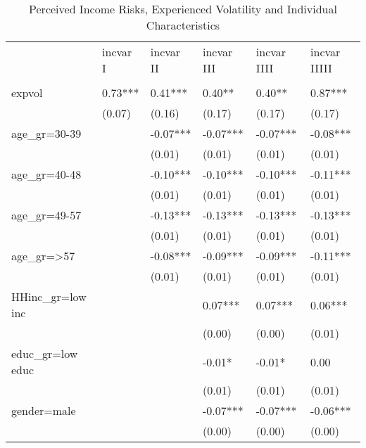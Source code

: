 
\begin{table}[p]
\centering
\begin{adjustbox}{width=\textwidth}
\begin{threeparttable}
\caption{Perceived Income Risks, Experienced Volatility and Individual Characteristics}
\label{micro_reg}\begin{tabular}{llllll}
\toprule
{} & incvar I & incvar II & incvar III & incvar IIII & incvar IIIII \\
                 &          &           &            &             &              \\
\midrule
expvol           &  0.73*** &   0.41*** &     0.40** &      0.40** &      0.87*** \\
                 &   (0.07) &    (0.16) &     (0.17) &      (0.17) &       (0.17) \\
age\_gr=30-39     &          &  -0.07*** &   -0.07*** &    -0.07*** &     -0.08*** \\
                 &          &    (0.01) &     (0.01) &      (0.01) &       (0.01) \\
age\_gr=40-48     &          &  -0.10*** &   -0.10*** &    -0.10*** &     -0.11*** \\
                 &          &    (0.01) &     (0.01) &      (0.01) &       (0.01) \\
age\_gr=49-57     &          &  -0.13*** &   -0.13*** &    -0.13*** &     -0.13*** \\
                 &          &    (0.01) &     (0.01) &      (0.01) &       (0.01) \\
age\_gr=>57       &          &  -0.08*** &   -0.09*** &    -0.09*** &     -0.11*** \\
                 &          &    (0.01) &     (0.01) &      (0.01) &       (0.01) \\
HHinc\_gr=low inc &          &           &    0.07*** &     0.07*** &      0.06*** \\
                 &          &           &     (0.00) &      (0.00) &       (0.01) \\
educ\_gr=low educ &          &           &     -0.01* &      -0.01* &         0.00 \\
                 &          &           &     (0.01) &      (0.01) &       (0.01) \\
gender=male      &          &           &   -0.07*** &    -0.07*** &     -0.06*** \\
                 &          &           &     (0.00) &      (0.00) &       (0.00) \\

\end{tabular}
\end{threeparttable}
\end{adjustbox}
\end{table}
